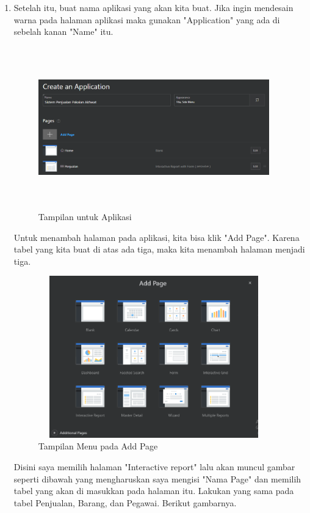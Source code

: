 \documentclass[a4paper, 12pt]{article}
\begin{document}
\begin{enumerate}
\item Setelah itu, buat nama aplikasi yang akan kita buat. Jika ingin mendesain warna pada halaman aplikasi maka gunakan "Application" yang ada di sebelah kanan "Name" itu. 

            \begin{figure}[!htbp]
            \centering
            \includegraphics[width=10cm,height=7cm]{gambar/3-createapp.PNG}
            \caption{Tampilan untuk Aplikasi}
            \label{penanda}
            \end{figure}
            
\par Untuk menambah halaman pada aplikasi, kita bisa klik "Add Page". Karena tabel yang kita buat di atas ada tiga, maka kita menambah halaman menjadi tiga. 

            \begin{figure}[!htbp]
            \centering
            \includegraphics[width=10cm,height=7cm]{gambar/4-createapp.PNG}
            \caption{Tampilan Menu pada Add Page}
            \label{penanda}
            \end{figure}
            
\par Disini saya memilih halaman "Interactive report" lalu akan muncul gambar seperti dibawah yang mengharuskan saya mengisi "Nama Page" dan memilih tabel yang akan di masukkan pada halaman itu. Lakukan yang sama pada tabel Penjualan, Barang, dan Pegawai. Berikut gambarnya.


\end{enumerate}
\end{document}
